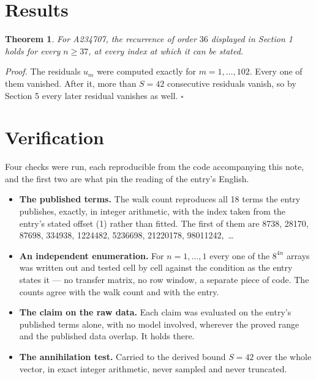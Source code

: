 \documentclass[11pt]{article}
\newtheorem{theorem}{Theorem}
\theoremstyle{definition}
\begin{document}
\section{Results}

\begin{theorem} For A234707, the recurrence of order $36$ displayed in Section 1 holds for every $n \ge 37$, at every index at which it can be stated.\end{theorem}

{\itshape Proof.} The residuals $u_m$ were computed exactly for $m = 1,\dots,102$. Every one of them vanished. After it, more than $S = 42$ consecutive residuals vanish, so by Section 5 every later residual vanishes as well. $\square$

\section{Verification}

Four checks were run, each reproducible from the code accompanying this note, and the first two are what pin the reading of the entry's English.

\begin{itemize}

\item {\bfseries The published terms.} The walk count reproduces all 18 terms the entry publishes, exactly, in integer arithmetic, with the index taken from the entry's stated offset (1) rather than fitted. The first of them are 8738, 28170, 87698, 334938, 1224482, 5236698, 21220178, 98011242,~\dots

\item {\bfseries An independent enumeration.} For $n = 1,\dots,1$ every one of the $8^{4n}$ arrays was written out and tested cell by cell against the condition as the entry states it --- no transfer matrix, no row window, a separate piece of code. The counts agree with the walk count and with the entry.

\item {\bfseries The claim on the raw data.} Each claim was evaluated on the entry's published terms alone, with no model involved, wherever the proved range and the published data overlap. It holds there.

\item {\bfseries The annihilation test.} Carried to the derived bound $S = 42$ over the whole vector, in exact integer arithmetic, never sampled and never truncated.

\end{itemize}
\end{document}
